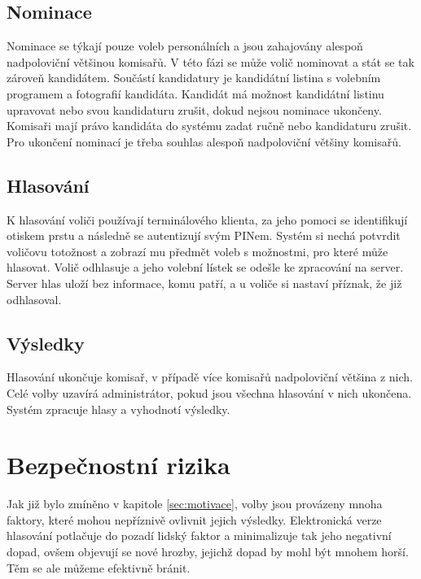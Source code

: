 \documentclass[11pt,twoside,a4paper]{book}
\begin{document}
\subsection{Nominace} \label{sec:nominace}

Nominace se týkají pouze voleb personálních a jsou zahajovány alespoň nadpoloviční většinou komisařů. V této fázi se může volič nominovat a stát se tak zároveň kandidátem. Součástí kandidatury je kandidátní listina s volebním programem a fotografií kandidáta. Kandidát má možnost kandidátní listinu upravovat nebo svou kandidaturu zrušit, dokud nejsou nominace ukončeny. Komisaři mají právo kandidáta do systému zadat ručně nebo kandidaturu zrušit. Pro ukončení nominací je třeba souhlas alespoň nadpoloviční většiny komisařů. 

\subsection{Hlasování}

K hlasování voliči používají terminálového klienta, za jeho pomoci se identifikují otiskem prstu a následně se autentizují svým PINem. Systém si nechá potvrdit voličovu totožnost a zobrazí mu předmět voleb s možnostmi, pro které může hlasovat. Volič odhlasuje a jeho volební lístek se odešle ke zpracování na server. Server hlas uloží bez informace, komu patří, a u voliče si nastaví příznak, že již odhlasoval.

\subsection{Výsledky}

Hlasování ukončuje komisař, v případě více komisařů nadpoloviční většina z nich. Celé volby uzavírá administrátor, pokud jsou všechna hlasování v nich ukončena. Systém zpracuje hlasy a vyhodnotí výsledky.

\section{Bezpečnostní rizika} \label{sec:bezpecnostni_rizika}

Jak již bylo zmíněno v kapitole \ref{sec:motivace}, volby jsou provázeny mnoha faktory, které mohou nepříznivě ovlivnit jejich výsledky. Elektronická verze hlasování potlačuje do pozadí lidský faktor a minimalizuje tak jeho negativní dopad, ovšem objevují se nové hrozby, jejichž dopad by mohl být mnohem horší. Těm se ale můžeme efektivně bránit.
\end{document}
